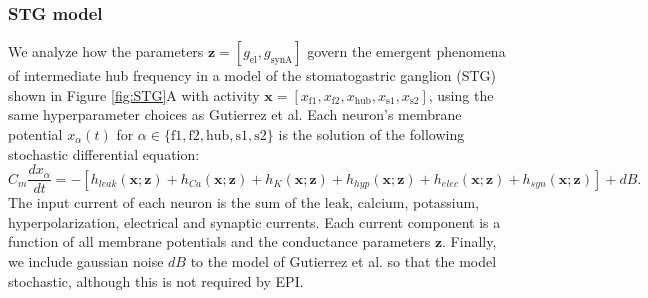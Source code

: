 \documentclass[11pt]{article}
\begin{document}
\subsubsection{STG model} \label{methods_stg_model}
We analyze how the parameters $\mathbf{z} = [ g_{\text{el}}, g_{\text{synA}}]$ govern the emergent phenomena of intermediate hub frequency in a model of the stomatogastric ganglion (STG) \cite{gutierrez2013multiple} shown in Figure \ref{fig:STG}A with activity $\mathbf{x} = \left[ x_{\text{f1}}, x_{\text{f2}}, x_{\text{hub}}, x_{\text{s1}}, x_{\text{s2}} \right]$, using the same hyperparameter choices as Gutierrez et al.
Each neuron's membrane potential $x_\alpha(t)$ for $\alpha \in \{ \text{f1}, \text{f2}, \text{hub}, \text{s1}, \text{s2} \}$ is the solution of the following stochastic differential equation:
\begin{equation} C_m \frac{dx_\alpha}{dt} = - \left[ h_{leak}(\mathbf{x}; \mathbf{z}) + h_{Ca}(\mathbf{x}; \mathbf{z}) + h_K(\mathbf{x}; \mathbf{z}) + h_{hyp}(\mathbf{x}; \mathbf{z}) + h_{elec}(\mathbf{x}; \mathbf{z}) + h_{syn}(\mathbf{x}; \mathbf{z})\right] + dB.
\end{equation} 
The input current of each neuron is the sum of the leak, calcium, potassium, hyperpolarization, electrical and synaptic currents.
Each current component is a function of all membrane potentials and the conductance parameters $\mathbf{z}$.
Finally, we include gaussian noise $dB$ to the model of Gutierrez et al. so that the model stochastic, although this is not required by EPI.
\end{document}
